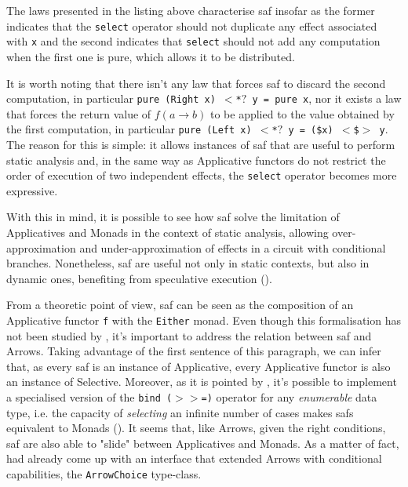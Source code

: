 \documentclass[
  oneside,
  11pt, a4paper,
  footinclude=true,
  headinclude=true,
  cleardoublepage=empty
]{scrbook}
\theoremstyle{definition}
\theoremstyle{definition}
\begin{document}
	            The laws presented in the listing above characterise \gls{saf} insofar as the former indicates that the \texttt{select} operator should not duplicate any effect associated with \texttt{x} and the second indicates that \texttt{select} should not add any computation when the first one is pure, which allows it to be distributed.
	            
	            It is worth noting that there isn't any law that forces \gls{saf} to discard the second computation, in particular \texttt{pure (Right x) $<$*$?$ y = pure x}, nor it exists a law that forces the return value of $f (a \rightarrow b)$ to be applied to the value obtained by the first computation, in particular \texttt{pure (Left x) $<$*$?$ y = (\$x) $<$\$$>$ y}. The reason for this is simple: it allows instances of \gls{saf} that are useful to perform static analysis and, in the same way as Applicative functors do not restrict the order of execution of two independent effects, the \texttt{select} operator becomes more expressive.
	            
	            With this in mind, it is possible to see how \gls{saf} solve the limitation of Applicatives and Monads in the context of static analysis, allowing over-approximation and under-approximation of effects in a circuit with conditional branches. Nonetheless, \gls{saf} are useful not only in static contexts, but also in dynamic ones, benefiting from speculative execution (\cite{andrey2019selective}).
	            
	            From a theoretic point of view, \gls{saf} can be seen as the composition of an Applicative functor \texttt{f} with the \texttt{Either} monad. Even though this formalisation has not been studied by \cite{andrey2019selective}, it's important to address the relation between \gls{saf} and Arrows. Taking advantage of the first sentence of this paragraph, we can infer that, as every \gls{saf} is an instance of Applicative, every Applicative functor is also an instance of Selective. Moreover, as it is pointed by \cite{andrey2019selective}, it's possible to implement a specialised version of the \texttt{bind ($>>$=)} operator for any \emph{enumerable} data type, i.e. the capacity of \emph{selecting} an infinite number of cases makes \gls{saf}s equivalent to Monads (\cite{gist_2019}). It seems that, like Arrows, given the right conditions, \gls{saf} are also able to "slide" between Applicatives and Monads. As a matter of fact, \cite{Hughes:2000:GMA:347238.347246} had already come up with an interface that extended Arrows with conditional capabilities, the \texttt{ArrowChoice} type-class.
	            
\end{document}
